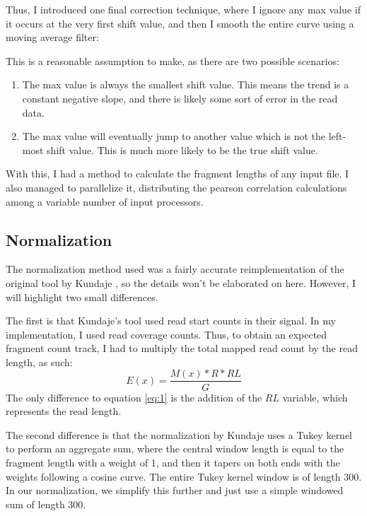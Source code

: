 \documentclass[a4paper]{article}
\begin{document}
    Thus, I introduced one final correction technique, where I ignore any max value if it occurs at the very first
    shift value, and then I smooth the entire curve using a moving average filter:
    
    This is a reasonable assumption to make, as there are two possible scenarios:
    \begin{enumerate}
      \item The max value is always the smallest shift value. This means the trend is a constant negative slope, and
            there is likely some sort of error in the read data.
      \item The max value will eventually jump to another value which is not the left-most shift value. This is much
            more likely to be the true shift value.
    \end{enumerate}
    With this, I had a method to calculate the fragment lengths of any input file. I also managed to parallelize it,
    distributing the pearson correlation calculations among a variable number of input processors.

    \subsection{Normalization}
    \label{methods:normalization}
    The normalization method used was a fairly accurate reimplementation of the original tool by Kundaje \cite{hoffman_integrative_2013}, so
    the details won't be elaborated on here. However, I will highlight two small differences.

    The first is that Kundaje's tool used read start counts in their signal. In my implementation, I used read
    coverage counts. Thus, to obtain an expected fragment count track, I had to multiply the total mapped read count by the read
    length, as such:
    \begin{equation}
      \label{eq:3}
      E(x) = \frac{M(x)*R*RL}{G}
    \end{equation}
    The only difference to equation \ref{eq:1} is the addition of the $RL$ variable, which represents the read length.

    The second difference is that the normalization by Kundaje uses a Tukey kernel to perform an aggregate sum,
    where the central window length is equal to the fragment length with a weight of 1, and then it tapers on both ends
    with the weights following a cosine curve. The entire Tukey kernel window is of length 300. In our normalization,
    we simplify this further and just use a simple windowed sum of length 300.
\end{document}

